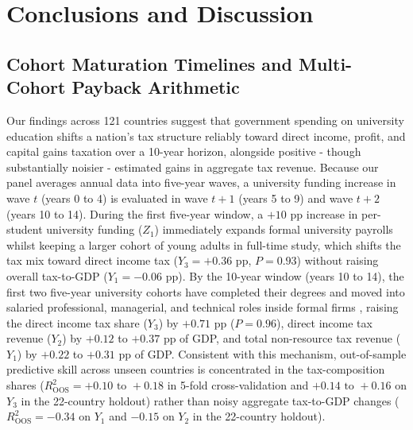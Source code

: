 \documentclass[11pt,a4paper]{article}
\begin{document}
\section{Conclusions and Discussion}
\label{sec:discussion}

\subsection{Cohort Maturation Timelines and Multi-Cohort Payback Arithmetic}

Our findings across 121 countries suggest that government spending on university education shifts a nation's tax structure reliably toward direct income, profit, and capital gains taxation over a 10-year horizon, alongside positive - though substantially noisier - estimated gains in aggregate tax revenue. Because our panel averages annual data into five-year waves, a university funding increase in wave $t$ (years 0 to 4) is evaluated in wave $t+1$ (years 5 to 9) and wave $t+2$ (years 10 to 14). During the first five-year window, a $+10$ pp increase in per-student university funding ($Z_1$) immediately expands formal university payrolls whilst keeping a larger cohort of young adults in full-time study, which shifts the tax mix toward direct income tax ($Y_3 = +0.36$ pp, $P = 0.93$) without raising overall tax-to-GDP ($Y_1 = -0.06$ pp). By the 10-year window (years 10 to 14), the first two five-year university cohorts have completed their degrees and moved into salaried professional, managerial, and technical roles inside formal firms \citep{kleven2016why, valero2019economic, jensen2022employment}, raising the direct income tax share ($Y_3$) by $+0.71$ pp ($P = 0.96$), direct income tax revenue ($Y_2$) by $+0.12$ to $+0.37$ pp of GDP, and total non-resource tax revenue ($Y_1$) by $+0.22$ to $+0.31$ pp of GDP. Consistent with this mechanism, out-of-sample predictive skill across unseen countries is concentrated in the tax-composition shares ($R^2_{\text{OOS}} = +0.10\text{ to }+0.18$ in 5-fold cross-validation and $+0.14\text{ to }+0.16$ on $Y_3$ in the 22-country holdout) rather than noisy aggregate tax-to-GDP changes ($R^2_{\text{OOS}} = -0.34$ on $Y_1$ and $-0.15$ on $Y_2$ in the 22-country holdout).
\end{document}
